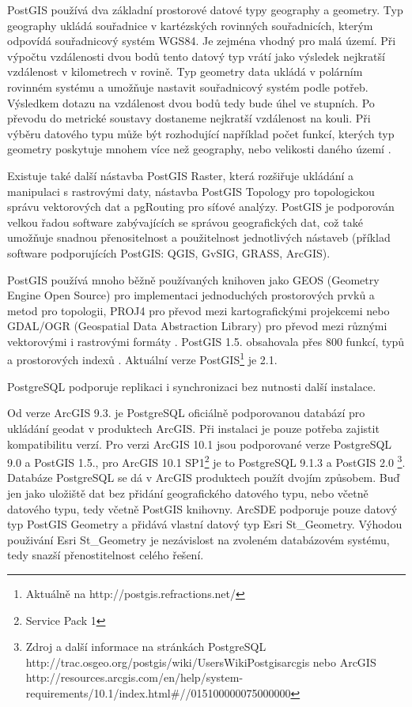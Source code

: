         PostGIS používá dva základní prostorové datové typy geography a
        geometry. Typ geography ukládá souřadnice v kartézských rovinných
        souřadnicích, kterým odpovídá souřadnicový systém WGS84. Je zejména
        vhodný pro malá území. Při výpočtu vzdálenosti dvou bodů tento datový
        typ vrátí jako výsledek nejkratší vzdálenost v kilometrech v rovině.
        Typ geometry data ukládá v polárním rovinném systému a umožňuje
        nastavit souřadnicový systém podle potřeb. Výsledkem dotazu na
        vzdálenost dvou bodů tedy bude úhel ve stupních. Po převodu do metrické
        soustavy dostaneme nejkratší vzdálenost na kouli. Při výběru datového
        typu může být rozhodující například počet funkcí, kterých typ geometry
        poskytuje mnohem více než geography, nebo velikosti daného území
        \citep{OpenGeo2012}.

        Existuje také další nástavba PostGIS Raster, která rozšiřuje ukládání a
        manipulaci s rastrovými daty, nástavba PostGIS Topology pro
        topologickou správu vektorových dat a pgRouting pro síťové analýzy.
        PostGIS je podporován velkou řadou software zabývajících se správou
        geografických dat, což také umožňuje snadnou přenositelnost a
        použitelnost jednotlivých nástaveb (příklad software podporujících
        PostGIS: QGIS, GvSIG, GRASS, ArcGIS).

        PostGIS používá mnoho běžně používaných knihoven jako GEOS (Geometry
        Engine Open Source) pro implementaci jednoduchých prostorových prvků a
        metod pro topologii, PROJ4 pro převod mezi kartografickými projekcemi
        nebo GDAL/OGR (Geospatial Data Abstraction Library) pro převod mezi
        různými vektorovými i rastrovými formáty \citep{ObeHsu2011}. PostGIS
        1.5. obsahovala přes 800 funkcí, typů a prostorových indexů
        \citep{ObeHsu2012}. Aktuální verze PostGIS\footnote{Aktuálně na
        http://postgis.refractions.net/} je 2.1.

        PostgreSQL podporuje replikaci i synchronizaci bez nutnosti další
        instalace. 

        Od verze ArcGIS 9.3. je PostgreSQL oficiálně podporovanou databází pro
        ukládání geodat v produktech ArcGIS. Při instalaci je pouze potřeba
        zajistit kompatibilitu verzí. Pro verzi ArcGIS 10.1 jsou podporované
        verze PostgreSQL 9.0 a PostGIS 1.5., pro ArcGIS 10.1
        SP1\footnote{Service Pack 1} je to PostgreSQL 9.1.3 a PostGIS 2.0
        \citep{OSGEO2013}\footnote{Zdroj a další informace na stránkách
        PostgreSQL http://trac.osgeo.org/postgis/wiki/UsersWikiPostgisarcgis
      nebo ArcGIS http://resources.arcgis.com/en/help/system-requirements/10.1/index.html\#//015100000075000000}.
    Databáze PostgreSQL se dá v ArcGIS produktech použít dvojím způsobem. Buď
    jen jako uložiště dat bez přidání geografického datového typu, nebo včetně
    datového typu, tedy včetně PostGIS knihovny. ArcSDE podporuje pouze datový
    typ PostGIS Geometry a přidává vlastní datový typ Esri St\_Geometry.
    Výhodou použivání Esri St\_Geometry je nezávislost na zvoleném databázovém
    systému, tedy snazší přenostitelnost celého řešení. 

